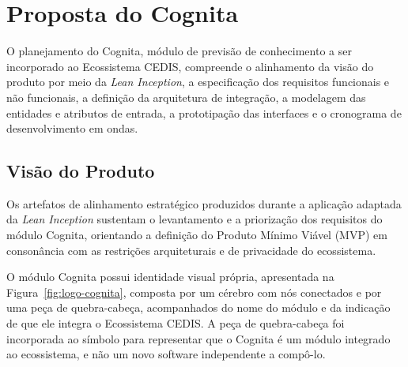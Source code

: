 
\chapter{Proposta do Cognita}

\raggedbottom

\newcommand{\espacofigura}[2][6cm]{%
  \fbox{\parbox[c][#1][c]{0.94\textwidth}{\centering\textit{#2}}}}

\newcommand{\espacotexto}[1]{\par\noindent\textit{#1}\par}

O planejamento do Cognita, módulo de previsão de conhecimento a ser incorporado ao Ecossistema CEDIS, compreende o alinhamento da visão do produto por meio da \textit{Lean Inception}, a especificação dos requisitos funcionais e não funcionais, a definição da arquitetura de integração, a modelagem das entidades e atributos de entrada, a prototipação das interfaces e o cronograma de desenvolvimento em ondas.


\section{Visão do Produto}
\label{sec:visao-produto}

Os artefatos de alinhamento estratégico produzidos durante a aplicação adaptada da \textit{Lean Inception} \cite{caroli_lean_2018} sustentam o levantamento e a priorização dos requisitos do módulo Cognita, orientando a definição do Produto Mínimo Viável (MVP) em consonância com as restrições arquiteturais e de privacidade do ecossistema.

O módulo Cognita possui identidade visual própria, apresentada na Figura~\ref{fig:logo-cognita}, composta por um cérebro com nós conectados e por uma peça de quebra-cabeça, acompanhados do nome do módulo e da indicação de que ele integra o Ecossistema CEDIS. A peça de quebra-cabeça foi incorporada ao símbolo para representar que o Cognita é um módulo integrado ao ecossistema, e não um novo software independente a compô-lo.

